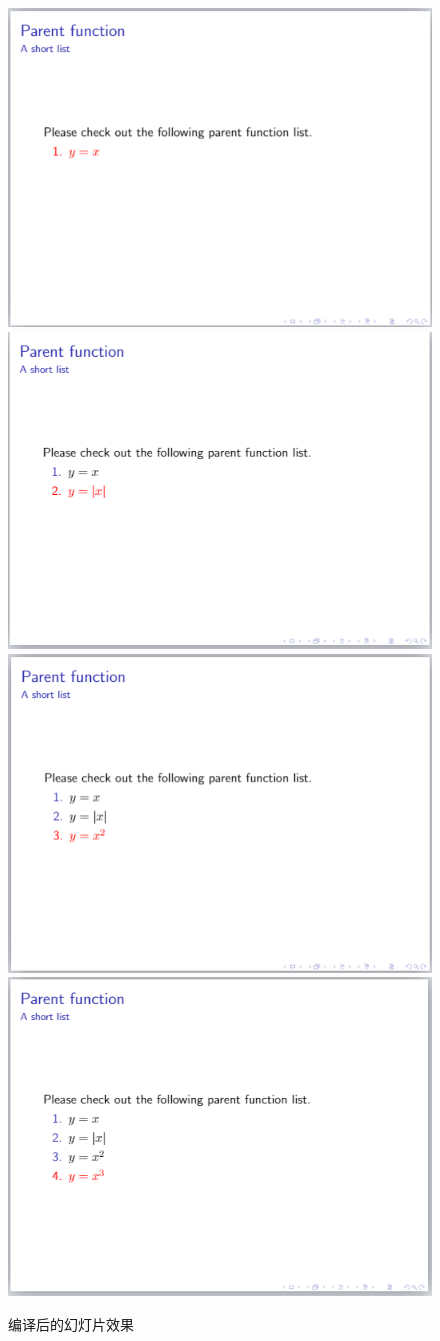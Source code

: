 \begin{figure}[htbp]
    \centering
    \includegraphics[width = 0.45\linewidth]{images/ch_9/NEWexample7_1.png}
    \includegraphics[width = 0.45\linewidth]{images/ch_9/NEWexample7_2.png}
    \includegraphics[width = 0.45\linewidth]{images/ch_9/NEWexample7_3.png}
    \includegraphics[width = 0.45\linewidth]{images/ch_9/NEWexample7_4.png}
    \caption{编译后的幻灯片效果}
    \label{fig:913}
\end{figure}

